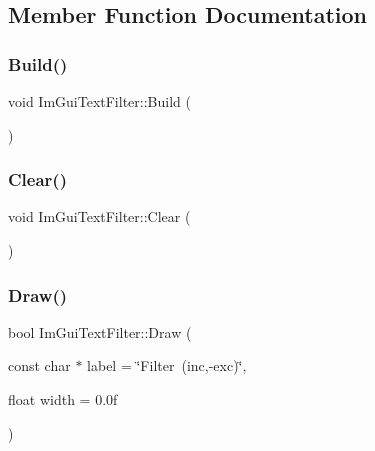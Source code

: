 \subsection{Member Function Documentation}
\hypertarget{struct_im_gui_text_filter_aef362baafaa9dfa62d11bc6101c0f4c1}{}\label{struct_im_gui_text_filter_aef362baafaa9dfa62d11bc6101c0f4c1} 
\subsubsection{\texorpdfstring{Build()}{Build()}}
{\footnotesize\ttfamily void Im\+Gui\+Text\+Filter\+::\+Build (\begin{DoxyParamCaption}{ }\end{DoxyParamCaption})}

\hypertarget{struct_im_gui_text_filter_a9043c1f0c33d29e6fc9b75ae81f9705a}{}\label{struct_im_gui_text_filter_a9043c1f0c33d29e6fc9b75ae81f9705a} 
\subsubsection{\texorpdfstring{Clear()}{Clear()}}
{\footnotesize\ttfamily void Im\+Gui\+Text\+Filter\+::\+Clear (\begin{DoxyParamCaption}{ }\end{DoxyParamCaption})}

\hypertarget{struct_im_gui_text_filter_ab93ad5985019ff9d3781606551fc26cc}{}\label{struct_im_gui_text_filter_ab93ad5985019ff9d3781606551fc26cc} 
\subsubsection{\texorpdfstring{Draw()}{Draw()}}
{\footnotesize\ttfamily bool Im\+Gui\+Text\+Filter\+::\+Draw (\begin{DoxyParamCaption}\item[{const char $\ast$}]{label = {\ttfamily \char`\"{}Filter~(inc,-\/exc)\char`\"{}},  }\item[{float}]{width = {\ttfamily 0.0f} }\end{DoxyParamCaption})}

\hypertarget{struct_im_gui_text_filter_a493158f2ab8f45fcf303c3f953be9b88}{}\label{struct_im_gui_text_filter_a493158f2ab8f45fcf303c3f953be9b88} 
